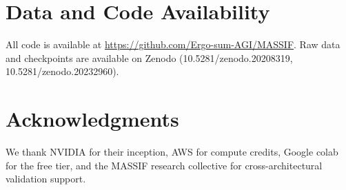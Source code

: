 \documentclass{article}
\begin{document}
\section*{Data and Code Availability}

All code is available at \url{https://github.com/Ergo-sum-AGI/MASSIF}. Raw data and checkpoints are available on Zenodo (10.5281/zenodo.20208319, 10.5281/zenodo.20232960).

\section*{Acknowledgments}

We thank NVIDIA for their inception, AWS for compute credits, Google colab for the free tier, and the MASSIF research collective for cross-architectural validation support.
\end{document}
